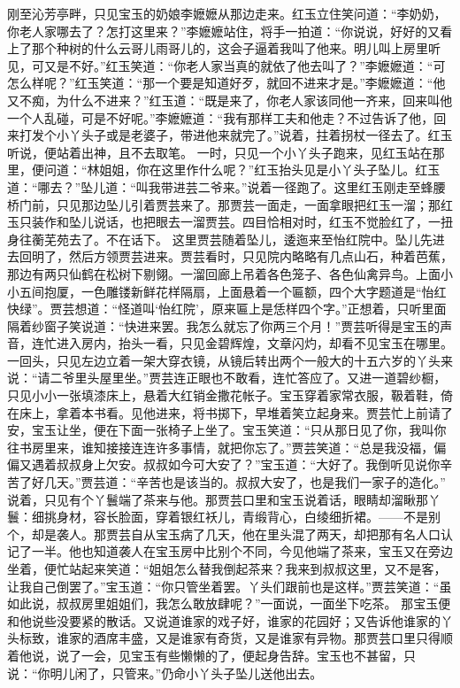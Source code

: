 \documentclass[12pt,oneside]{book}
\begin{document}
刚至沁芳亭畔，只见宝玉的奶娘李嬷嬷从那边走来。红玉立住笑问道：“李奶奶，你老人家哪去了？怎打这里来？”李嬷嬷站住，将手一拍道：“你说说，好好的又看上了那个种树的什么云哥儿雨哥儿的，这会子逼着我叫了他来。明儿叫上房里听见，可又是不好。”红玉笑道：“你老人家当真的就依了他去叫了？”李嬷嬷道：“可怎么样呢？”红玉笑道：“那一个要是知道好歹，就回不进来才是。”李嬷嬷道：“他又不痴，为什么不进来？”红玉道：“既是来了，你老人家该同他一齐来，回来叫他一个人乱碰，可是不好呢。”李嬷嬷道：“我有那样工夫和他走？不过告诉了他，回来打发个小丫头子或是老婆子，带进他来就完了。”说着，拄着拐杖一径去了。红玉听说，便站着出神，且不去取笔。
一时，只见一个小丫头子跑来，见红玉站在那里，便问道：“林姐姐，你在这里作什么呢？”红玉抬头见是小丫头子坠儿。红玉道：“哪去？”坠儿道：“叫我带进芸二爷来。”说着一径跑了。这里红玉刚走至蜂腰桥门前，只见那边坠儿引着贾芸来了。那贾芸一面走，一面拿眼把红玉一溜；那红玉只装作和坠儿说话，也把眼去一溜贾芸。四目恰相对时，红玉不觉脸红了，一扭身往蘅芜苑去了。不在话下。
这里贾芸随着坠儿，逶迤来至怡红院中。坠儿先进去回明了，然后方领贾芸进来。贾芸看时，只见院内略略有几点山石，种着芭蕉，那边有两只仙鹤在松树下剔翎。一溜回廊上吊着各色笼子、各色仙禽异鸟。上面小小五间抱厦，一色雕镂新鲜花样隔扇，上面悬着一个匾额，四个大字题道是“怡红快绿”。贾芸想道：“怪道叫‘怡红院’，原来匾上是恁样四个字。”正想着，只听里面隔着纱窗子笑说道：“快进来罢。我怎么就忘了你两三个月！”贾芸听得是宝玉的声音，连忙进入房内，抬头一看，只见金碧辉煌，文章闪灼，却看不见宝玉在哪里。一回头，只见左边立着一架大穿衣镜，从镜后转出两个一般大的十五六岁的丫头来说：“请二爷里头屋里坐。”贾芸连正眼也不敢看，连忙答应了。又进一道碧纱橱，只见小小一张填漆床上，悬着大红销金撒花帐子。宝玉穿着家常衣服，靸着鞋，倚在床上，拿着本书看。见他进来，将书掷下，早堆着笑立起身来。贾芸忙上前请了安，宝玉让坐，便在下面一张椅子上坐了。宝玉笑道：“只从那日见了你，我叫你往书房里来，谁知接接连连许多事情，就把你忘了。”贾芸笑道：“总是我没福，偏偏又遇着叔叔身上欠安。叔叔如今可大安了？”宝玉道：“大好了。我倒听见说你辛苦了好几天。”贾芸道：“辛苦也是该当的。叔叔大安了，也是我们一家子的造化。”
说着，只见有个丫鬟端了茶来与他。那贾芸口里和宝玉说着话，眼睛却溜瞅那丫鬟：细挑身材，容长脸面，穿着银红袄儿，青缎背心，白绫细折裙。——不是别个，却是袭人。那贾芸自从宝玉病了几天，他在里头混了两天，却把那有名人口认记了一半。他也知道袭人在宝玉房中比别个不同，今见他端了茶来，宝玉又在旁边坐着，便忙站起来笑道：“姐姐怎么替我倒起茶来？我来到叔叔这里，又不是客，让我自己倒罢了。”宝玉道：“你只管坐着罢。丫头们跟前也是这样。”贾芸笑道：“虽如此说，叔叔房里姐姐们，我怎么敢放肆呢？”一面说，一面坐下吃茶。
那宝玉便和他说些没要紧的散话。又说道谁家的戏子好，谁家的花园好；又告诉他谁家的丫头标致，谁家的酒席丰盛，又是谁家有奇货，又是谁家有异物。那贾芸口里只得顺着他说，说了一会，见宝玉有些懒懒的了，便起身告辞。宝玉也不甚留，只说：“你明儿闲了，只管来。”仍命小丫头子坠儿送他出去。
\end{document}
